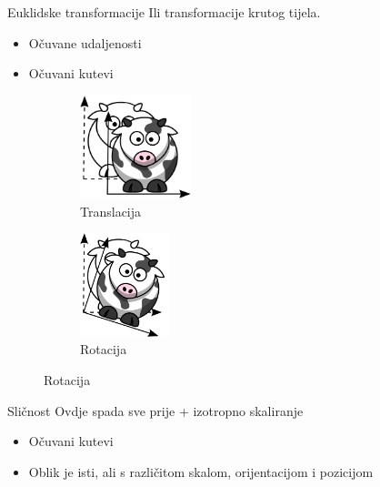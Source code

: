 \documentclass[9pt]{beamer}
\begin{document}
\begin{frame}{Euklidske transformacije}
	Ili transformacije krutog tijela.
	\begin{itemize}
		\item Očuvane udaljenosti
		\item Očuvani kutevi
	\end{itemize}
	\begin{figure}
		\begin{subfigure}[b]{0.35\linewidth}
			\includegraphics[height=3cm]{slike/funny_cow_translate.png}
			\caption{Translacija}
		\end{subfigure}
		\begin{subfigure}[b]{0.35\linewidth}
			\includegraphics[height=3cm]{slike/funny_cow_rotate.png}
			\caption{Rotacija}
		\end{subfigure}
	\end{figure}
\end{frame}

\begin{frame}{Sličnost}
	Ovdje spada sve prije + izotropno skaliranje
	\begin{itemize}
		\item Očuvani kutevi
		\item Oblik je isti, ali s različitom skalom, orijentacijom i pozicijom
		
	\end{itemize}
\end{frame}
\end{document}
